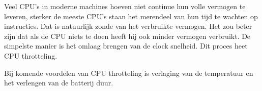 Veel CPU's in moderne machines hoeven niet continue hun volle vermogen te leveren, sterker de meeste CPU's staan het merendeel van hun tijd te wachten op instructies. Dat is natuurlijk zonde van het verbruikte vermogen. Het zou beter zijn dat als de CPU niets te doen heeft hij ook minder vermogen verbruikt. De simpelste manier is het omlaag brengen van de clock snelheid. Dit proces heet CPU throtteling.

Bij komende voordelen van CPU throtteling is verlaging van de temperatuur en het verlengen van de batterij duur.

